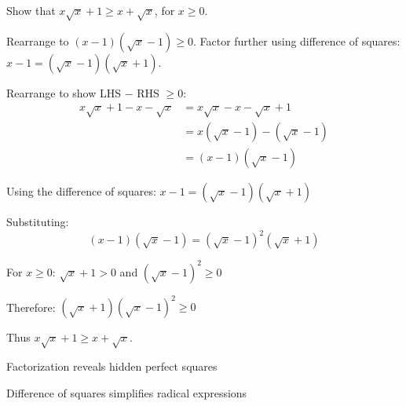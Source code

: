 \begin{problem}
Show that $x\sqrt{x} + 1 \ge x + \sqrt{x}$, for $x \ge 0$.
\end{problem}

\begin{hint}
Rearrange to $(x-1)(\sqrt{x}-1) \ge 0$. Factor further using difference of squares: $x-1 = (\sqrt{x}-1)(\sqrt{x}+1)$.
\end{hint}

\begin{solution}
Rearrange to show LHS $-$ RHS $\ge 0$:
\begin{align*}
x\sqrt{x} + 1 - x - \sqrt{x} &= x\sqrt{x} - x - \sqrt{x} + 1 \\
&= x(\sqrt{x} - 1) - (\sqrt{x} - 1) \\
&= (x - 1)(\sqrt{x} - 1)
\end{align*}

Using the difference of squares: $x - 1 = (\sqrt{x} - 1)(\sqrt{x} + 1)$

Substituting:
\[ (x - 1)(\sqrt{x} - 1) = (\sqrt{x} - 1)^2(\sqrt{x} + 1) \]

For $x \ge 0$: $\sqrt{x} + 1 > 0$ and $(\sqrt{x} - 1)^2 \ge 0$

Therefore: $(\sqrt{x} + 1)(\sqrt{x} - 1)^2 \ge 0$

Thus $x\sqrt{x} + 1 \ge x + \sqrt{x}$.
\end{solution}

\begin{takeaways}

\item Factorization reveals hidden perfect squares
\item Difference of squares simplifies radical expressions

\end{takeaways}
